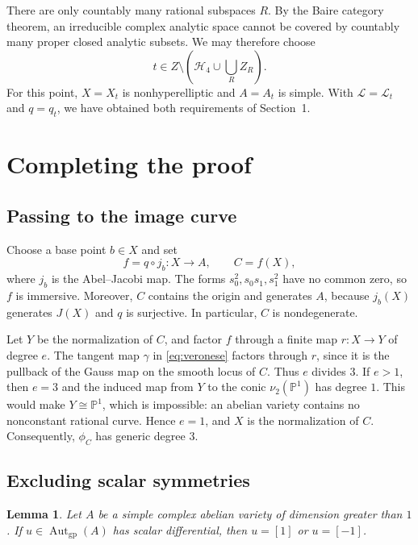 \documentclass[11pt]{amsart}
\newtheorem{lemma}{Lemma}[section]
\theoremstyle{remark}
\DeclareMathOperator{\Aut}{Aut}
\newcommand{\PP}{\mathbb P}
\newcommand{\LL}{\mathcal L}
\numberwithin{equation}{section}
\begin{document}
There are only countably many rational subspaces $R$. By the Baire
category theorem, an irreducible complex analytic space cannot be
covered by countably many proper closed analytic subsets. We may
therefore choose
\[
t\in Z\setminus\left(\mathcal H_4\cup\bigcup_R Z_R\right).
\]
For this point, $X=X_t$ is nonhyperelliptic and $A=A_t$ is simple.
With $\LL=\LL_t$ and $q=q_t$, we have obtained both requirements of
Section~1.

\section{Completing the proof}\label{sec:completion}

\subsection{Passing to the image curve}
Choose a base point $b\in X$ and set
\[
f=q\circ j_b:X\longrightarrow A,\qquad C=f(X),
\]
where $j_b$ is the Abel--Jacobi map. The forms $s_0^2,s_0s_1,s_1^2$
have no common zero, so $f$ is immersive. Moreover, $C$ contains the
origin and generates $A$, because $j_b(X)$ generates $J(X)$ and $q$ is
surjective. In particular, $C$ is nondegenerate.

Let $Y$ be the normalization of $C$, and factor $f$ through a finite map
$r:X\to Y$ of degree $e$. The tangent map $\gamma$ in
\eqref{eq:veronese} factors through $r$, since it is the pullback of
the Gauss map on the smooth locus of $C$. Thus $e$ divides $3$. If
$e>1$, then $e=3$ and the induced map from $Y$ to the conic
$\nu_2(\PP^1)$ has degree $1$. This would make $Y\cong\PP^1$, which
is impossible: an abelian variety contains no nonconstant rational
curve. Hence $e=1$, and $X$ is the normalization of $C$. Consequently,
$\phi_C$ has generic degree $3$.

\subsection{Excluding scalar symmetries}
\begin{lemma}\label{lem:scalar}
Let $A$ be a simple complex abelian variety of dimension greater than
$1$. If $u\in\Aut_{\mathrm{gp}}(A)$ has scalar differential, then
$u=[1]$ or $u=[-1]$.
\end{lemma}
\end{document}
